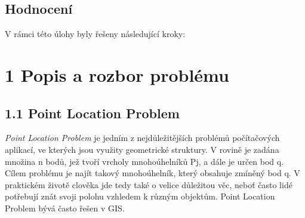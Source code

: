 \subsection*{\textbf{Hodnocení}}
V rámci této úlohy byly řešeny následující kroky:
\begin{table}[htbp]
\end{table}

\newpage
\section*{1 Popis a rozbor problému}
\subsection*{1.1 Point Location Problem}
\textit{Point Location Problem} je jedním z nejdůležitějších problémů počítačových aplikací, ve kterých jsou využity geometrické struktury. V rovině je zadána množina n bodů, jež tvoří vrcholy mnohoúhelníků Pj, a dále je určen bod q. Cílem problému je najít takový mnohoúhelník, který obsahuje zmíněný bod q. V praktickém životě clověka jde tedy také o velice důležitou věc, neboť často lidé potřebují znát svoji polohu vzhledem k různým objektům. Point Location Problem bývá často řešen v GIS.
\vspace{0.8cm}

